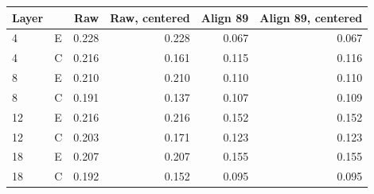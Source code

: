 \begin{tabular}{llrrrr}
\toprule
Layer &  & Raw & Raw, centered & Align 89 & Align 89, centered \\
\midrule
4 & E & 0.228 & 0.228 & 0.067 & 0.067 \\
4 & C & 0.216 & 0.161 & 0.115 & 0.116 \\
8 & E & 0.210 & 0.210 & 0.110 & 0.110 \\
8 & C & 0.191 & 0.137 & 0.107 & 0.109 \\
12 & E & 0.216 & 0.216 & 0.152 & 0.152 \\
12 & C & 0.203 & 0.171 & 0.123 & 0.123 \\
18 & E & 0.207 & 0.207 & 0.155 & 0.155 \\
18 & C & 0.192 & 0.152 & 0.095 & 0.095 \\
\bottomrule
\end{tabular}
